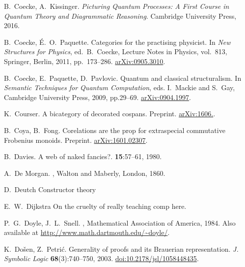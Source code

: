 \begin{thebibliography}{RSW00}
    
    B.\ Coecke, A.\ Kissinger.
    \newblock \textsl{Picturing Quantum Processes: A First Course in Quantum Theory and Diagrammatic Reasoning}.
    \newblock Cambridge University Press, 2016.

    B.\ Coecke, \'E.\ O.\ Paquette.
    \newblock Categories for the practising physicist.
    \newblock In {\sl New Structures for Physics}, ed.\ B.\ Coecke,  
    Lecture Notes in Physics, vol.\ 813, Springer, Berlin, 2011, pp.\ 173--286.
    \newblock \href{http://arxiv.org/abs/0905.3010}{arXiv:0905.3010}.

    B.\ Coecke, E.\ Paquette, D.\ Pavlovic.
    \newblock Quantum and classical structuralism.
    \newblock In \textsl{Semantic Techniques for Quantum
    Computation}, eds. I.\ Mackie and S.\ Gay, Cambridge University Press, 2009,
    pp.29--69.
    \newblock \href{http://arxiv.org/abs/0904.1997}{arXiv:0904.1997}.

    K.\ Courser.
    \newblock A bicategory of decorated cospans.
    \newblock Preprint. 
    \newblock \href{http://arxiv.org/abs/1606.}{arXiv:1606.}.

    B.\ Coya, B.\ Fong.
    \newblock Corelations are the prop for extraspecial commutative Frobenius
    monoids.
    \newblock Preprint.
    \newblock \href{http://arxiv.org/abs/1601.02307}{arXiv:1601.02307}.

    B.\ Davies.
    \newblock A web of naked fancies?.
     {\bf 15}:57--61, 1980.
    
    A.\ De Morgan.
    , Walton and Maberly,
    London, 1860.


    D.\ Deutch
    \newblock Constructor theory
    
    E.\ W.\ Dijkstra
    \newblock On the cruelty of really teaching comp
    \newblock here.


    P.\ G.\ Doyle, J.\ L.\ Snell.
    , Mathematical Association of America, 1984.
    \newblock Also available at \href{http://www.math.dartmouth.edu/~doyle/}
    {http://www.math.dartmouth.edu/\~{}doyle/}.

    K.\ Do\v{s}en, Z.\ Petri\'c.
    \newblock Generality of proofs and its Brauerian representation.
    \newblock \textsl{J. Symbolic Logic} {\bf 68}(3):740--750, 2003.
    \newblock
    \href{http://doi.org/10.2178/jsl/1058448435}{doi:10.2178/jsl/1058448435}.


\end{thebibliography}
